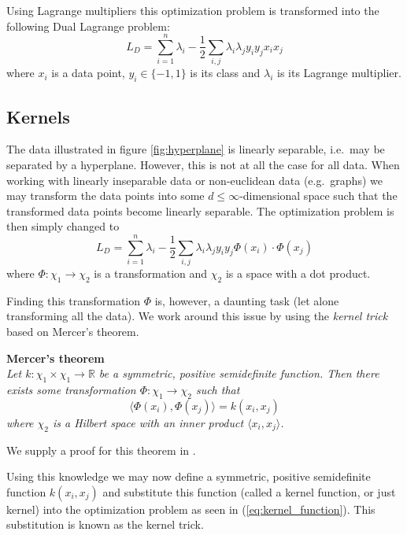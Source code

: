 \documentclass{article}
\begin{document}
Using Lagrange multipliers this optimization problem is transformed into the following Dual Lagrange problem:
\begin{equation}
\label{eq:dual_lagrange_problem}
L_D = \sum_{i=1}^{n}\lambda_i-\frac{1}{2}\sum_{i,j}\lambda_i\lambda_j y_iy_j x_ix_j
\end{equation}
where $x_i$ is a data point, $y_i\in \{-1, 1\}$ is its class and $\lambda_i$ is its Lagrange multiplier.

\subsection{Kernels}
The data illustrated in figure \ref{fig:hyperplane} is linearly separable, i.e.\ may be separated by a hyperplane. However, this is not at all the case for all data. When working with linearly inseparable data or non-euclidean data (e.g.\ graphs) we may transform the data points into some $d\leq\infty$-dimensional space such that the transformed data points become linearly separable. The optimization problem is then simply changed to
\begin{equation}
\label{eq:kernel_function_phi}
L_D = \sum_{i=1}^{n}\lambda_i-\frac{1}{2}\sum_{i,j}\lambda_i\lambda_j y_iy_j\Phi(x_i)\cdot\Phi(x_j)
\end{equation}
where $\Phi:\chi_1\rightarrow\chi_2$ is a transformation and $\chi_2$ is a space with a dot product.

Finding this transformation $\Phi$ is, however, a daunting task (let alone transforming all the data). We work around this issue by using the \textit{kernel trick} based on Mercer's theorem.

\textbf{Mercer's theorem}\\
\textit{Let $k:\chi_1\times\chi_1\rightarrow\mathbb{R}$ be a symmetric, positive semidefinite\cite{svn-introduction} function. Then there exists some transformation $\Phi:\chi_1\rightarrow\chi_2$ such that}
\begin{equation}
\langle\Phi(x_i),\Phi(x_j)\rangle=k(x_i,x_j)
\end{equation}
\textit{where $\chi_2$ is a Hilbert space with an inner product $\langle x_i, x_j\rangle$.}

We supply a proof for this theorem in \cite{svm-graph-kernels}.

Using this knowledge we may now define a symmetric, positive semidefinite function $k(x_i,x_j)$ and substitute this function (called a kernel function, or just kernel) into the optimization problem as seen in (\ref{eq:kernel_function}). This substitution is known as the kernel trick.
\end{document}
